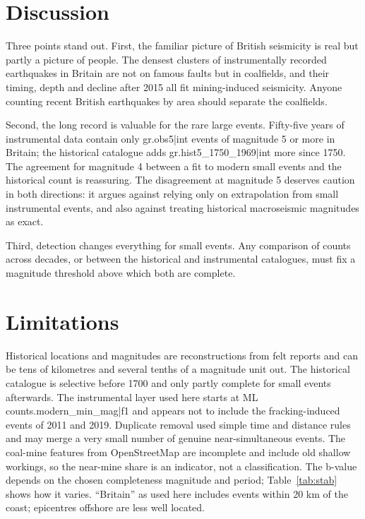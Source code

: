 \documentclass[11pt,a4paper]{article}
\begin{document}
\section{Discussion}

Three points stand out. First, the familiar picture of British seismicity is real but partly a picture of people. The densest clusters of instrumentally recorded earthquakes in Britain are not on famous faults but in coalfields, and their timing, depth and decline after 2015 all fit mining-induced seismicity. Anyone counting recent British earthquakes by area should separate the coalfields.

Second, the long record is valuable for the rare large events. Fifty-five years of instrumental data contain only {{gr.obs5|int}} events of magnitude 5 or more in Britain; the historical catalogue adds {{gr.hist5_1750_1969|int}} more since 1750. The agreement for magnitude 4 between a fit to modern small events and the historical count is reassuring. The disagreement at magnitude 5 deserves caution in both directions: it argues against relying only on extrapolation from small instrumental events, and also against treating historical macroseismic magnitudes as exact.

Third, detection changes everything for small events. Any comparison of counts across decades, or between the historical and instrumental catalogues, must fix a magnitude threshold above which both are complete.

\section{Limitations}

Historical locations and magnitudes are reconstructions from felt reports and can be tens of kilometres and several tenths of a magnitude unit out. The historical catalogue is selective before 1700 and only partly complete for small events afterwards. The instrumental layer used here starts at ML {{counts.modern_min_mag|f1}} and appears not to include the fracking-induced events of 2011 and 2019. Duplicate removal used simple time and distance rules and may merge a very small number of genuine near-simultaneous events. The coal-mine features from OpenStreetMap are incomplete and include old shallow workings, so the near-mine share is an indicator, not a classification. The b-value depends on the chosen completeness magnitude and period; Table~\ref{tab:stab} shows how it varies. ``Britain'' as used here includes events within 20 km of the coast; epicentres offshore are less well located.
\end{document}
